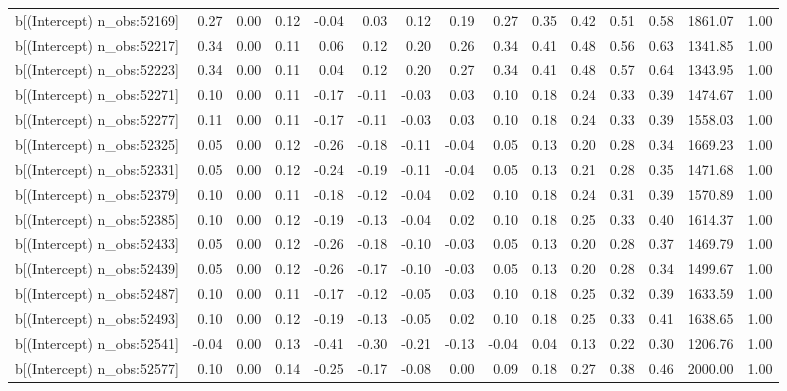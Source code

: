 \begin{table}[ht]
\begin{tabular}{rrrrrrrrrrrrrrr}
  b[(Intercept) n\_obs:52169] & 0.27 & 0.00 & 0.12 & -0.04 & 0.03 & 0.12 & 0.19 & 0.27 & 0.35 & 0.42 & 0.51 & 0.58 & 1861.07 & 1.00 \\ 
  b[(Intercept) n\_obs:52217] & 0.34 & 0.00 & 0.11 & 0.06 & 0.12 & 0.20 & 0.26 & 0.34 & 0.41 & 0.48 & 0.56 & 0.63 & 1341.85 & 1.00 \\ 
  b[(Intercept) n\_obs:52223] & 0.34 & 0.00 & 0.11 & 0.04 & 0.12 & 0.20 & 0.27 & 0.34 & 0.41 & 0.48 & 0.57 & 0.64 & 1343.95 & 1.00 \\ 
  b[(Intercept) n\_obs:52271] & 0.10 & 0.00 & 0.11 & -0.17 & -0.11 & -0.03 & 0.03 & 0.10 & 0.18 & 0.24 & 0.33 & 0.39 & 1474.67 & 1.00 \\ 
  b[(Intercept) n\_obs:52277] & 0.11 & 0.00 & 0.11 & -0.17 & -0.11 & -0.03 & 0.03 & 0.10 & 0.18 & 0.24 & 0.33 & 0.39 & 1558.03 & 1.00 \\ 
  b[(Intercept) n\_obs:52325] & 0.05 & 0.00 & 0.12 & -0.26 & -0.18 & -0.11 & -0.04 & 0.05 & 0.13 & 0.20 & 0.28 & 0.34 & 1669.23 & 1.00 \\ 
  b[(Intercept) n\_obs:52331] & 0.05 & 0.00 & 0.12 & -0.24 & -0.19 & -0.11 & -0.04 & 0.05 & 0.13 & 0.21 & 0.28 & 0.35 & 1471.68 & 1.00 \\ 
  b[(Intercept) n\_obs:52379] & 0.10 & 0.00 & 0.11 & -0.18 & -0.12 & -0.04 & 0.02 & 0.10 & 0.18 & 0.24 & 0.31 & 0.39 & 1570.89 & 1.00 \\ 
  b[(Intercept) n\_obs:52385] & 0.10 & 0.00 & 0.12 & -0.19 & -0.13 & -0.04 & 0.02 & 0.10 & 0.18 & 0.25 & 0.33 & 0.40 & 1614.37 & 1.00 \\ 
  b[(Intercept) n\_obs:52433] & 0.05 & 0.00 & 0.12 & -0.26 & -0.18 & -0.10 & -0.03 & 0.05 & 0.13 & 0.20 & 0.28 & 0.37 & 1469.79 & 1.00 \\ 
  b[(Intercept) n\_obs:52439] & 0.05 & 0.00 & 0.12 & -0.26 & -0.17 & -0.10 & -0.03 & 0.05 & 0.13 & 0.20 & 0.28 & 0.34 & 1499.67 & 1.00 \\ 
  b[(Intercept) n\_obs:52487] & 0.10 & 0.00 & 0.11 & -0.17 & -0.12 & -0.05 & 0.03 & 0.10 & 0.18 & 0.25 & 0.32 & 0.39 & 1633.59 & 1.00 \\ 
  b[(Intercept) n\_obs:52493] & 0.10 & 0.00 & 0.12 & -0.19 & -0.13 & -0.05 & 0.02 & 0.10 & 0.18 & 0.25 & 0.33 & 0.41 & 1638.65 & 1.00 \\ 
  b[(Intercept) n\_obs:52541] & -0.04 & 0.00 & 0.13 & -0.41 & -0.30 & -0.21 & -0.13 & -0.04 & 0.04 & 0.13 & 0.22 & 0.30 & 1206.76 & 1.00 \\ 
  b[(Intercept) n\_obs:52577] & 0.10 & 0.00 & 0.14 & -0.25 & -0.17 & -0.08 & 0.00 & 0.09 & 0.18 & 0.27 & 0.38 & 0.46 & 2000.00 & 1.00 \\ 

\end{tabular}
\end{table}

